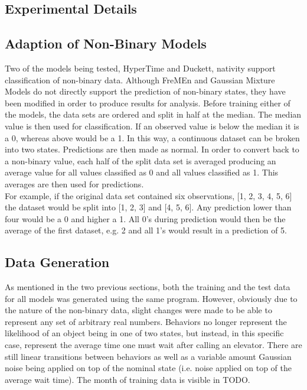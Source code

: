   \subsection{ Experimental Details }

  \subsection{ Adaption of Non-Binary Models }

  Two of the models being tested, HyperTime and Duckett, nativity support
  classification of non-binary data. Although FreMEn and Gaussian Mixture Models
  do not directly support the prediction of non-binary states, they have been
  modified in order to produce results for analysis. Before training either of
  the models, the data sets are ordered and split in half at the median. The
  median value is then used for classification. If an observed value is below
  the median it is a 0, whereas above would be a 1. In this way, a continuous
  dataset can be broken into two states. Predictions are then made as normal.
  In order to convert back to a non-binary value, each half of the split data
  set is averaged producing an average value for all values classified as 0 and
  all values classified as 1. This averages are then used for predictions. \\

  For example, if the original data set contained six observations,
  [1, 2, 3, 4, 5, 6] the dataset would be split into [1, 2, 3] and [4, 5, 6].
  Any prediction lower than four would be a 0 and higher a 1. All 0's during
  prediction would then be the average of the first dataset, e.g. 2 and all
  1's would result in a prediction of 5.

  \subsection{ Data Generation }

  As mentioned in the two previous sections, both the training and the test
  data for all models was generated using the same program. However, obviously
  due to the nature of the non-binary data, slight changes were made to be able
  to represent any set of arbitrary real numbers. Behaviors no longer represent
  the likelihood of an object being in one of two states, but instead, in this
  specific case, represent the average time one must wait after calling an
  elevator. There are still linear transitions between behaviors as well as
  a variable amount Gaussian noise being applied on top of the nominal state
  (i.e. noise applied on top of the average wait time). The month of training
  data is visible in TODO. \\


